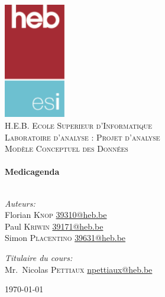 \begin{titlepage}
	\begin{center}

		\includegraphics[keepaspectratio=true,width=0.20\textwidth]{../ressources/logo}\\[1cm]

		\textsc{\LARGE H.E.B. Ecole Superieur d'Informatique}\\[1.5cm]

		\textsc{\Large Laboratoire d'analyse : Projet d'analyse}\\[0.5cm]
		\textsc{\Large Modèle Conceptuel des Données}\\[0.5cm]

		\HRule \\[0.4cm]
		{\huge \bfseries Medicagenda \\[0.4cm]}
		\HRule \\[1.5cm]

		\noindent
		\begin{minipage}[t]{0.4\textwidth}
			\begin{flushleft} \large
				\emph{Auteurs:}\\
				Florian \textsc{Knop} \href{mailto:39310@heb.be}{39310@heb.be}\\
				Paul \textsc{Kriwin} \href{mailto:39171@heb.be}{39171@heb.be}\\
				Simon \textsc{Placentino} \href{mailto:39631@heb.be}{39631@heb.be}\
			\end{flushleft}
		\end{minipage}%
		\begin{minipage}[t]{0.4\textwidth}
			\begin{flushright} \large
				\emph{Titulaire du cours:} \\
				Mr.~Nicolas \textsc{Pettiaux}
				\href{mailto:npettiaux@heb.be}{npettiaux@heb.be}
			\end{flushright}
		\end{minipage}

		\vfill

		{\large \today}

	\end{center}
	\clearpage\null\newpage
\end{titlepage}
